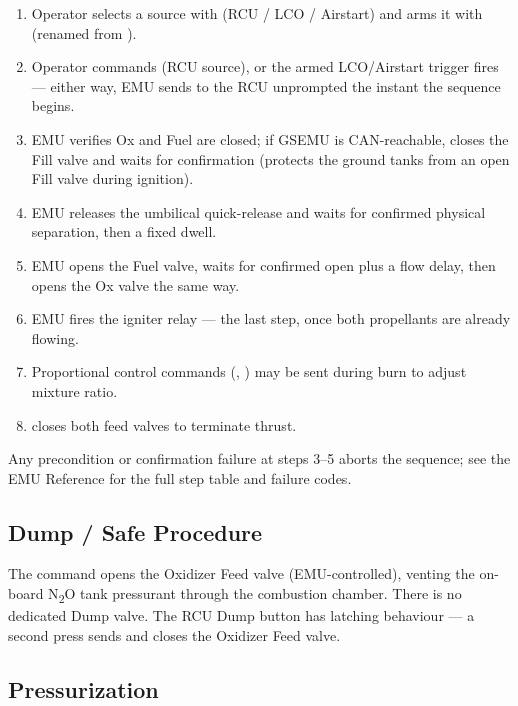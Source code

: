 \documentclass[11pt,letterpaper]{article}
\begin{document}
\begin{enumerate}[nosep]
  \item Operator selects a source with 
        (RCU / LCO / Airstart) and arms it with 
        (renamed from ).
  \item Operator commands  (RCU source), or the armed
        LCO/Airstart trigger fires --- either way, EMU sends
         to the RCU unprompted the instant the
        sequence begins.
  \item EMU verifies Ox and Fuel are closed; if GSEMU is CAN-reachable,
        closes the Fill valve and waits for confirmation (protects the
        ground tanks from an open Fill valve during ignition).
  \item EMU releases the umbilical quick-release and waits for confirmed
        physical separation, then a fixed dwell.
  \item EMU opens the Fuel valve, waits for confirmed open plus a flow
        delay, then opens the Ox valve the same way.
  \item EMU fires the igniter relay --- the last step, once both
        propellants are already flowing.
  \item Proportional control commands (,
        ) may be sent during burn to adjust mixture
        ratio.
  \item {} closes both feed valves to terminate
        thrust.
\end{enumerate}

Any precondition or confirmation failure at steps 3--5 aborts the
sequence; see the EMU Reference for the full step table and failure
codes.

\subsection{Dump / Safe Procedure}

The  command opens the Oxidizer Feed valve (EMU-controlled), venting
the on-board N\textsubscript{2}O tank pressurant through the combustion chamber.
There is no dedicated Dump valve.  The RCU Dump button has latching behaviour
--- a second press sends  and closes the Oxidizer Feed valve.

\subsection{Pressurization}
\end{document}
